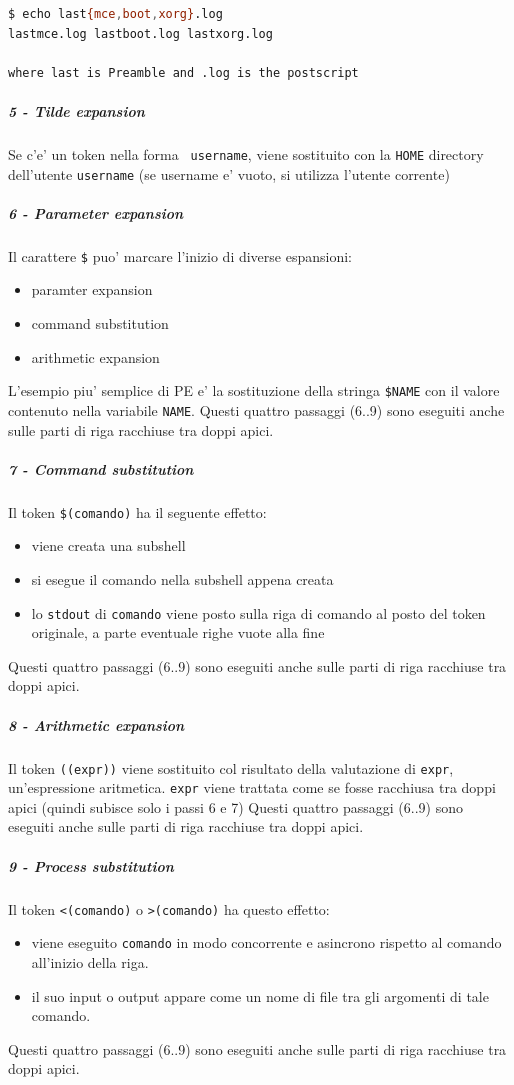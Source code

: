 \begin{lstlisting}[language=bash,basicstyle=\ttfamily,frame=single]
$ echo last{mce,boot,xorg}.log
lastmce.log lastboot.log lastxorg.log

where last is Preamble and .log is the postscript
\end{lstlisting}


\subparagraph{5 - Tilde expansion}
Se c'e' un token nella forma \texttt{~username}, viene sostituito con la \texttt{HOME} 
directory dell'utente \texttt{username} (se username e' vuoto, si utilizza l'utente
corrente)

\subparagraph{6 - Parameter expansion}
Il carattere \texttt{\$} puo' marcare l'inizio di diverse espansioni:
\begin{itemize}
	\item paramter expansion
	\item command substitution
	\item arithmetic expansion
\end{itemize}
L'esempio piu' semplice di PE e' la sostituzione della stringa \texttt{\$NAME} con il 
valore contenuto nella variabile \texttt{NAME}.
Questi quattro passaggi (6..9) sono eseguiti anche sulle parti 
di riga racchiuse tra doppi apici.

\subparagraph{7 - Command substitution}
Il token \texttt{\$(comando)} ha il seguente effetto:
\begin{itemize}
	\item viene creata una subshell 
	\item si esegue il comando nella subshell appena creata 
	\item lo \texttt{stdout} di \texttt{comando} viene posto sulla riga di comando
		al posto del token originale, a parte eventuale righe vuote alla fine
\end{itemize}
Questi quattro passaggi (6..9) sono eseguiti anche sulle parti 
di riga racchiuse tra doppi apici.

\subparagraph{8 - Arithmetic expansion}
Il token \texttt{((expr))} viene sostituito col risultato della valutazione di 
\texttt{expr}, un'espressione aritmetica. \texttt{expr} viene trattata come se fosse
racchiusa tra doppi apici (quindi subisce solo i passi 6 e 7) 
Questi quattro passaggi (6..9) sono eseguiti anche sulle parti 
di riga racchiuse tra doppi apici.

\subparagraph{9 - Process substitution}
Il token \texttt{<(comando)} o \texttt{>(comando)} ha questo effetto:

\begin{itemize}
	\item viene eseguito \texttt{comando} in modo concorrente e asincrono rispetto al comando
		all'inizio della riga.
	\item il suo input o output appare come un nome di file tra gli argomenti di tale comando.
\end{itemize}
Questi quattro passaggi (6..9) sono eseguiti anche sulle parti 
di riga racchiuse tra doppi apici.

